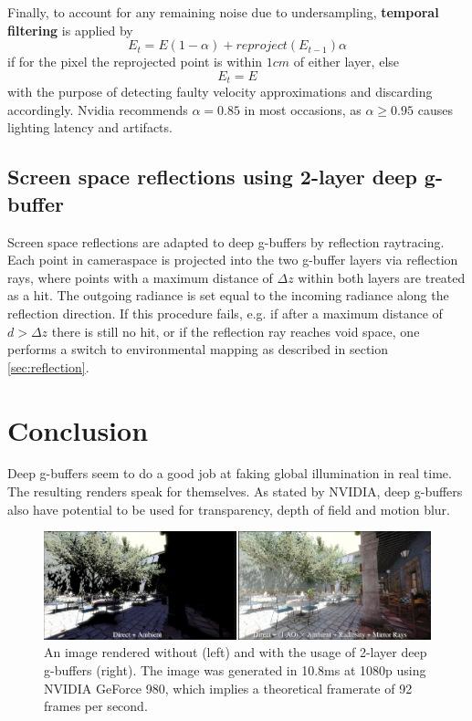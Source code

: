 \documentclass{ACGSeminar}
\begin{document}
		Finally, to account for any remaining noise due to undersampling, \textbf{temporal filtering} is applied by
		$$ E_t = E(1 - \alpha) + reproject(E_{t-1}) \alpha $$
		if for the pixel the reprojected point is within $1cm$ of either layer, else
		$$ E_t = E $$
		with the purpose of detecting faulty velocity approximations and discarding accordingly. Nvidia recommends $\alpha = 0.85$ in most occasions, as $\alpha \geq 0.95$ causes lighting latency and artifacts.

	\subsection{Screen space reflections using 2-layer deep g-buffer}
		Screen space reflections are adapted to deep g-buffers by reflection raytracing. Each point in cameraspace is projected into the two g-buffer layers via reflection rays, where points with a maximum distance of $\Delta z$ within both layers are treated as a hit. The outgoing radiance is set equal to the incoming radiance along the reflection direction. If this procedure fails, e.g. if after a maximum distance of $d > \Delta z$ there is still no hit, or if the reflection ray reaches void space, one performs a switch to environmental mapping as described in section \ref{sec:reflection}.

\section{Conclusion}
	Deep g-buffers seem to do a good job at faking global illumination in real time. The resulting renders speak for themselves. As stated by NVIDIA, deep g-buffers also have potential to be used for transparency, depth of field and motion blur.
	\begin{figure}[htb!]%
		\begin{center}%
			\includegraphics[width=16cm]{img/deep_g_buffer_render.png}
		\end{center}%
		\caption{An image rendered without (left) and with the usage of 2-layer deep g-buffers (right). The image was generated in 10.8ms at 1080p using NVIDIA GeForce 980, which implies a theoretical framerate of 92 frames per second.}%
		\label{fig:deep_g_buffer_render}%
	\end{figure}%

\printbibliography
\end{document}
